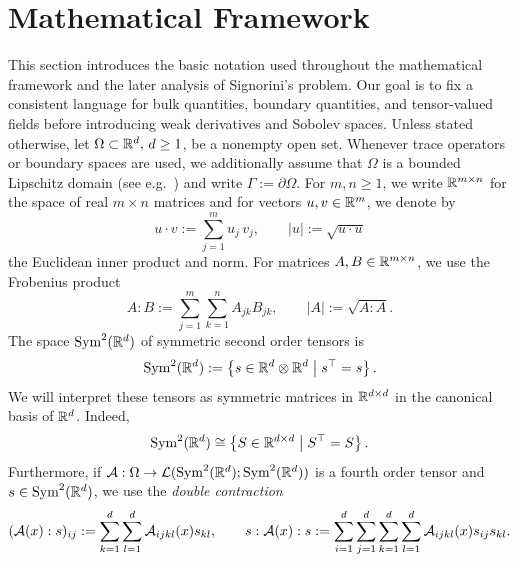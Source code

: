 \section{Mathematical Framework}
This section introduces the basic notation used throughout the mathematical framework and the later analysis of Signorini's problem. Our goal is to fix a consistent language for bulk quantities, boundary quantities, and tensor-valued fields before introducing weak derivatives and Sobolev spaces. Unless stated otherwise, let $\Omega\subset{\mathbb R}^d,\,d\ge 1$, be a nonempty open set. Whenever trace operators or boundary spaces are used, we additionally assume that $\Omega$ is a bounded Lipschitz domain (see e.g.\ \cite[Section 2.3]{book}) and write $\Gamma:=\partial\Omega$. For $m,n\ge 1$, we write ${\mathbb R}^{m\times n}$ for the space of real $m\times n$ matrices and for vectors $u,v\in{\mathbb R}^m$, we denote by
\begin{equation*}
	u\cdot v := \sum_{j=1}^m u_j\,v_j,
	\qquad
	|u| := \sqrt{u\cdot u}
\end{equation*}
the Euclidean inner product and norm. For matrices $A,B\in{\mathbb R}^{m\times n}$, we use the Frobenius product
\begin{equation}\label{eq:frobeniusproduct}
	A:B := \sum_{j=1}^m\sum_{k=1}^n A_{jk}B_{jk},
	\qquad
	|A| := \sqrt{A:A}.
\end{equation}
The space $\mathrm{Sym}^2({\mathbb R}^d)$ of symmetric second order tensors is
\begin{equation*}
	\mathrm{Sym}^2({\mathbb R}^d):= \left\{ s\in{\mathbb R}^d\otimes{\mathbb R}^d\;\middle|\; s^\top = s\right\}.
\end{equation*}
We will interpret these tensors as symmetric matrices in ${\mathbb R}^{d\times d}$ in the canonical basis of ${\mathbb R}^d$. Indeed,
\begin{equation*}
	\mathrm{Sym}^2({\mathbb R}^d)\cong \left\{S\in{\mathbb R}^{d\times d}\;\middle|\; S^\top = S\right\}.
\end{equation*}
Furthermore, if ${\mathcal A}:\Omega\to{\mathcal L}(\mathrm{Sym}^2({\mathbb R}^d);\mathrm{Sym}^2({\mathbb R}^d))$ is a fourth order tensor and $s\in\mathrm{Sym}^2({\mathbb R}^d)$, we use the {\em double contraction}
\begin{equation*}
	({\mathcal A}(x):s)_{ij}:=\sum_{k = 1}^d \sum_{l = 1}^d {\mathcal A}_{ijkl}(x)s_{kl},
	\qquad
	s:{\mathcal A}(x):s:=\sum_{i = 1}^d \sum_{j = 1}^d \sum_{k = 1}^d \sum_{l = 1}^d{\mathcal A}_{ijkl}(x)s_{ij}s_{kl}.
\end{equation*}
